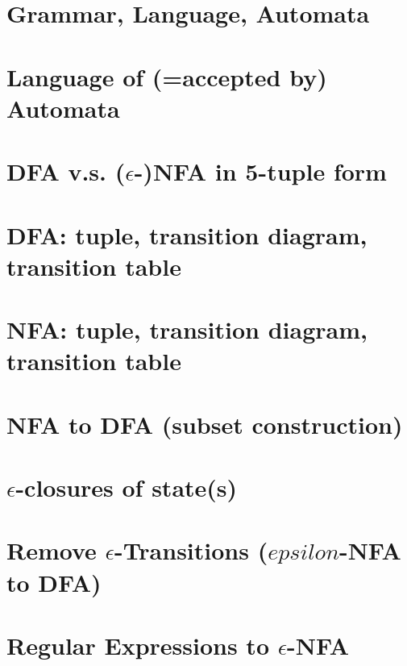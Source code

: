 \documentclass[10pt,a4paper,landscape]{article}
\begin{document}
\pagestyle{empty}

\begin{multicols*}{3}

\section*{Grammar, Language, Automata}


\section*{Language of (=accepted by) Automata}


\section*{DFA v.s. (\(\epsilon\)-)NFA in 5-tuple form}


\section*{DFA: tuple, transition diagram, transition table}


\section*{NFA: tuple, transition diagram, transition table}


\section*{NFA to DFA (subset construction)}


\section*{\(\epsilon\)-closures of state(s)}


\section*{Remove \(\epsilon\)-Transitions (\(epsilon\)-NFA to DFA)}


\section*{Regular Expressions to $\epsilon$-NFA}



\end{multicols*}
\end{document}
